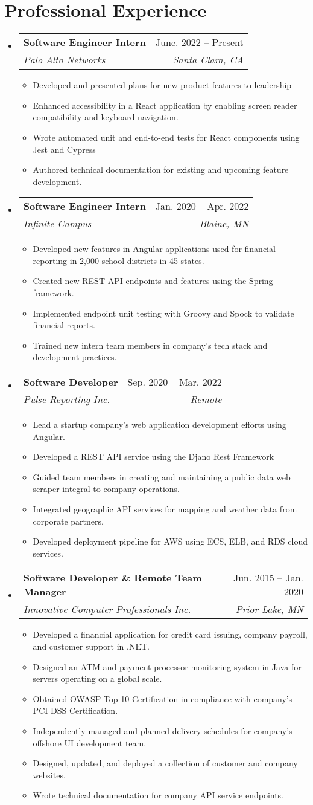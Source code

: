 \documentclass[letterpaper,11pt]{article}
\makeatletter
\newcommand{\resumeItem}[1]{\item\small{{#1 \vspace{-2pt}}}}
\newcommand{\resumeSection}[2]{\section{#1}\begin{itemize}[leftmargin=0.15in, label={}]#2\end{itemize}}
\newcommand{\resumeItemHeading}[4]{\vspace{-2pt}\item{\begin{tabular*}{0.97\textwidth}[t]{l@{\extracolsep{\fill}}r}\textbf{#1} & #2\\\textit{\small#3} & \textit{\small #4}\\\end{tabular*}\vspace{-7pt}}}
\newcommand{\resumeItemList}[1]{\begin{itemize}#1\end{itemize}\vspace{-5pt}}
\makeatother
\begin{document}
\resumeSection{Professional Experience}{
	\resumeItemHeading{Software Engineer Intern}{June. 2022 -- Present}{Palo Alto Networks}{Santa Clara, CA}
	\resumeItemList{
		\resumeItem{Developed and presented plans for new product features to leadership}
		\resumeItem{Enhanced accessibility in a React application by enabling screen reader compatibility and keyboard navigation.}
		\resumeItem{Wrote automated unit and end-to-end tests for React components using Jest and Cypress}
		\resumeItem{Authored technical documentation for existing and upcoming feature development.}
	}

	\resumeItemHeading{Software Engineer Intern}{Jan. 2020 -- Apr. 2022}{Infinite Campus}{Blaine, MN}
	\resumeItemList{
		\resumeItem{Developed new features in Angular applications used for financial reporting in 2,000 school districts in 45 states.}
		\resumeItem{Created new REST API endpoints and features using the Spring framework.}
		\resumeItem{Implemented endpoint unit testing with Groovy and Spock to validate financial reports.}
		\resumeItem{Trained new intern team members in company's tech stack and development practices.}
	}

	\resumeItemHeading{Software Developer}{Sep. 2020 -- Mar. 2022}{Pulse Reporting Inc.}{Remote}
	\resumeItemList{
		\resumeItem{Lead a startup company's web application development efforts using Angular.}
		\resumeItem{Developed a REST API service using the Djano Rest Framework}
		\resumeItem{Guided team members in creating and maintaining a public data web scraper integral to company operations.}
		\resumeItem{Integrated geographic API services for mapping and weather data from corporate partners.}
		\resumeItem{Developed deployment pipeline for AWS using ECS, ELB, and RDS cloud services.}
	}

	\resumeItemHeading{Software Developer \& Remote Team Manager}{Jun. 2015 -- Jan. 2020}{Innovative Computer Professionals Inc.}{Prior Lake, MN}
	\resumeItemList{
		\resumeItem{Developed a financial application for credit card issuing, company payroll, and customer support in .NET.}
		\resumeItem{Designed an ATM and payment processor monitoring system in Java for servers operating on a global scale.}
		\resumeItem{Obtained OWASP Top 10 Certification in compliance with company’s PCI DSS Certification.}
		\resumeItem{Independently managed and planned delivery schedules for company’s offshore UI development team.}
		\resumeItem{Designed, updated, and deployed a collection of customer and company websites.}
		\resumeItem{Wrote technical documentation for company API service endpoints.}
	}
}
\end{document}
